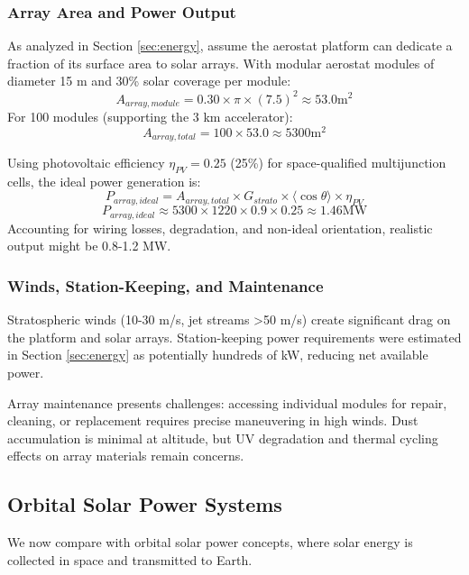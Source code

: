 \subsubsection{Array Area and Power Output}
As analyzed in Section \ref{sec:energy}, assume the aerostat platform can dedicate a fraction of its surface area to solar arrays. With modular aerostat modules of diameter 15 m and 30\% solar coverage per module:
\begin{equation}
A_{array,module} = 0.30 \times \pi \times (7.5)^2 \approx 53.0  \text{m}^2
\end{equation}
For 100 modules (supporting the 3 km accelerator):
\begin{equation}
A_{array,total} = 100 \times 53.0 \approx 5300  \text{m}^2
\end{equation}

Using photovoltaic efficiency \(\eta_{PV} = 0.25\) (25\%) for space-qualified multijunction cells, the ideal power generation is:
\begin{equation}
P_{array,ideal} = A_{array,total} \times G_{strato} \times \langle \cos\theta \rangle \times \eta_{PV}
\end{equation}
\begin{equation}
P_{array,ideal} \approx 5300 \times 1220 \times 0.9 \times 0.25 \approx 1.46  \text{MW}
\end{equation}
Accounting for wiring losses, degradation, and non-ideal orientation, realistic output might be 0.8-1.2 MW.

\subsubsection{Winds, Station-Keeping, and Maintenance}
Stratospheric winds (10-30 m/s, jet streams >50 m/s) create significant drag on the platform and solar arrays. Station-keeping power requirements were estimated in Section \ref{sec:energy} as potentially hundreds of kW, reducing net available power.

Array maintenance presents challenges: accessing individual modules for repair, cleaning, or replacement requires precise maneuvering in high winds. Dust accumulation is minimal at altitude, but UV degradation and thermal cycling effects on array materials remain concerns.

\subsection{Orbital Solar Power Systems}
We now compare with orbital solar power concepts, where solar energy is collected in space and transmitted to Earth.

